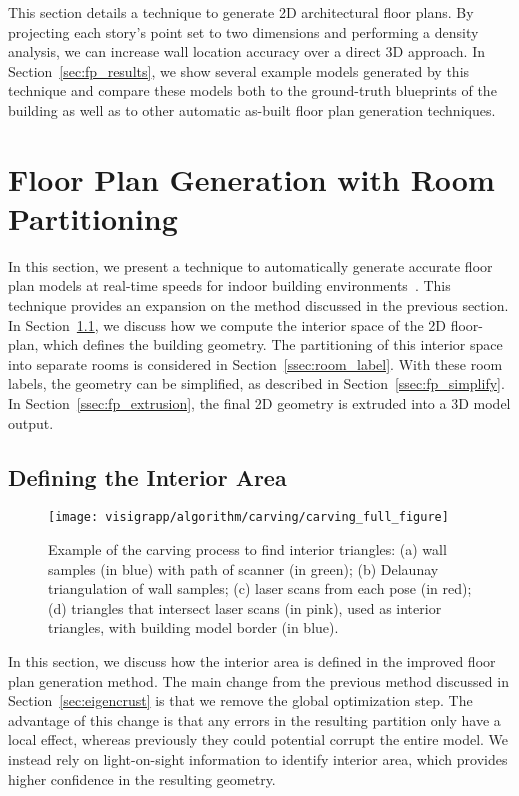 \documentclass[12pt,onecolumn,oneside]{book}
\begin{document}
This section details a technique to generate 2D architectural floor plans.  By projecting each story's point set to two dimensions and performing a density analysis, we can increase wall location accuracy over a direct 3D approach. In Section~\ref{sec:fp_results}, we show several example models generated by this technique and compare these models both to the ground-truth blueprints of the building as well as to other automatic as-built floor plan generation techniques.

\section{Floor Plan Generation with Room Partitioning}
\label{sec:visigrapp}

In this section, we present a technique to automatically generate accurate floor plan models at real-time speeds for indoor building environments~\cite{Turner14}.  This technique provides an expansion on the method discussed in the previous section.  In Section~\ref{ssec:visigrapp_carving}, we discuss how we compute the interior space of the 2D floor-plan, which defines the building geometry.  The partitioning of this interior space into separate rooms is considered in Section~\ref{ssec:room_label}.  With these room labels, the geometry can be simplified, as described in Section~\ref{ssec:fp_simplify}.  In Section~\ref{ssec:fp_extrusion}, the final 2D geometry is extruded into a 3D model output.

\subsection{Defining the Interior Area}
\label{ssec:visigrapp_carving}

\begin{figure}[t]
  \centering
  \texttt{[image: visigrapp/algorithm/carving/carving\_full\_figure]}
  \caption[Carving process to find interior triangles.]{Example of the carving process to find interior triangles:  (a) wall samples (in blue) with path of scanner (in green); (b) Delaunay triangulation of wall samples; (c) laser scans from each pose (in red); (d) triangles that intersect laser scans (in pink), used as interior triangles, with building model border (in blue).}
  \label{fig:visigrapp_floorplan_creation}
\end{figure}

In this section, we discuss how the interior area is defined in the improved floor plan generation method.  The main change from the previous method discussed in Section~\ref{sec:eigencrust} is that we remove the global optimization step.  The advantage of this change is that any errors in the resulting partition only have a local effect, whereas previously they could potential corrupt the entire model.  We instead rely on light-on-sight information to identify interior area, which provides higher confidence in the resulting geometry.
\end{document}
